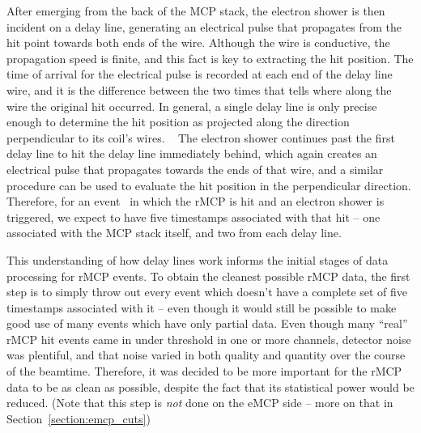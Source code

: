 After emerging from the back of the MCP stack, the electron shower is then incident on a delay line, generating an electrical pulse that propagates from the hit point towards both ends of the wire.  Although the wire is conductive, the propagation speed is finite, and this fact is key to extracting the hit position.  The time of arrival for the electrical pulse is recorded at each end of the delay line wire, and it is the difference between the two times that tells where along the wire the original hit occurred.  In general, a single delay line is only precise enough to determine the hit position as projected along the direction perpendicular to its coil's wires.
~ 
The electron shower continues past the first delay line to hit the delay line immediately behind, which again creates an electrical pulse that propagates towards the ends of that wire, and a similar procedure can be used to evaluate the hit position in the perpendicular direction.  Therefore, for an event~ in which the rMCP is hit and an electron shower is triggered, we expect to have five timestamps associated with that hit -- one associated with the MCP stack itself, and two from each delay line.

This understanding of how delay lines work informs the initial stages of data processing for rMCP events.  To obtain the cleanest possible rMCP data, the first step is to simply throw out every event which doesn't have a complete set of five timestamps associated with it -- even though it would still be possible to make good use of many events which have only partial data.  Even though many ``real'' rMCP hit events came in under threshold in one or more channels, detector noise was plentiful, 
and that noise varied in both quality and quantity over the course of the beamtime.  Therefore, it was decided to be more important for the rMCP data to be as clean as possible, despite the fact that its statistical power would be reduced. (Note that this step is \emph{not} done on the eMCP side -- more on that in Section~\ref{section:emcp_cuts})~  


